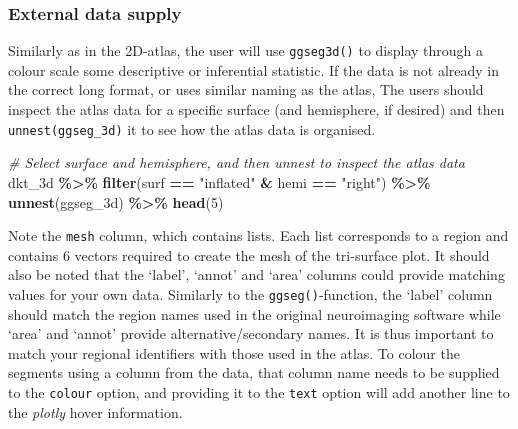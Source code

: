 \documentclass[fleqn,10pt]{wlpeerj} %
\newenvironment{Shaded}{\begin{snugshade}}{\end{snugshade}}
\newcommand{\CommentTok}[1]{\textcolor[rgb]{0.56,0.35,0.01}{\textit{#1}}}
\newcommand{\DecValTok}[1]{\textcolor[rgb]{0.00,0.00,0.81}{#1}}
\newcommand{\KeywordTok}[1]{\textcolor[rgb]{0.13,0.29,0.53}{\textbf{#1}}}
\newcommand{\NormalTok}[1]{#1}
\newcommand{\OperatorTok}[1]{\textcolor[rgb]{0.81,0.36,0.00}{\textbf{#1}}}
\newcommand{\StringTok}[1]{\textcolor[rgb]{0.31,0.60,0.02}{#1}}
\begin{document}
\normalsize

\hypertarget{external-data-supply}{%
\subsubsection{External data supply}\label{external-data-supply}}

Similarly as in the 2D-atlas, the user will use \texttt{ggseg3d()} to display through a colour scale some descriptive or inferential statistic.
If the data is not already in the correct long format, or uses similar naming as the atlas, The users should inspect the atlas data for a specific surface (and hemisphere, if desired) and then \texttt{unnest(ggseg\_3d)} it to see how the atlas data is organised.

\small

\begin{Shaded}
\begin{Highlighting}[]
\CommentTok{\# Select surface and hemisphere, and then unnest to inspect the atlas data}
\NormalTok{dkt\_3d }\OperatorTok{\%>\%}
\StringTok{  }\KeywordTok{filter}\NormalTok{(surf }\OperatorTok{==}\StringTok{ "inflated"} \OperatorTok{\&}\StringTok{ }\NormalTok{hemi }\OperatorTok{==}\StringTok{ "right"}\NormalTok{) }\OperatorTok{\%>\%}
\StringTok{  }\KeywordTok{unnest}\NormalTok{(ggseg\_3d) }\OperatorTok{\%>\%}
\StringTok{  }\KeywordTok{head}\NormalTok{(}\DecValTok{5}\NormalTok{)}
\end{Highlighting}
\end{Shaded}

\normalsize

Note the \texttt{mesh} column, which contains lists.
Each list corresponds to a region and contains 6 vectors required to create the mesh of the tri-surface plot.
It should also be noted that the `label', `annot' and `area' columns could provide matching values for your own data.
Similarly to the \texttt{ggseg()}-function, the `label' column should match the region names used in the original neuroimaging software while `area' and `annot' provide alternative/secondary names.
It is thus important to match your regional identifiers with those used in the atlas.
To colour the segments using a column from the data, that column name needs to be supplied to the \texttt{colour} option, and providing it to the \texttt{text} option will add another line to the \emph{plotly} hover information.
\end{document}
